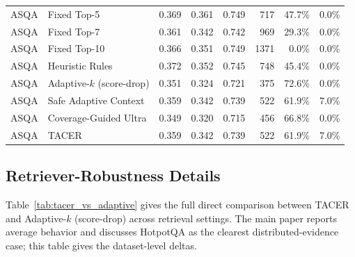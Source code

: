 \documentclass[11pt]{article}
\begin{document}
\begin{table}[!htbp]
{\begin{tabular}{llrrrrrr}
ASQA & Fixed Top-5 & 0.369 & 0.361 & 0.749 & 717 & 47.7\% & 0.0\% \\
ASQA & Fixed Top-7 & 0.361 & 0.342 & 0.742 & 969 & 29.3\% & 0.0\% \\
ASQA & Fixed Top-10 & 0.366 & 0.351 & 0.749 & 1371 & 0.0\% & 0.0\% \\
ASQA & Heuristic Rules & 0.372 & 0.352 & 0.745 & 748 & 45.4\% & 0.0\% \\
ASQA & Adaptive-$k$ (score-drop) & 0.351 & 0.324 & 0.721 & 375 & 72.6\% & 0.0\% \\
ASQA & Safe Adaptive Context & 0.359 & 0.342 & 0.739 & 522 & 61.9\% & 7.0\% \\
ASQA & Coverage-Guided Ultra & 0.349 & 0.320 & 0.715 & 456 & 66.8\% & 0.0\% \\
ASQA & TACER & 0.359 & 0.342 & 0.739 & 522 & 61.9\% & 7.0\% \\
\bottomrule
\end{tabular}%
}
\end{table}

\subsection{Retriever-Robustness Details}

Table~\ref{tab:tacer_vs_adaptive} gives the full direct comparison between TACER and Adaptive-$k$ (score-drop) across retrieval settings. The main paper reports average behavior and discusses HotpotQA as the clearest distributed-evidence case; this table gives the dataset-level deltas.
\end{document}
